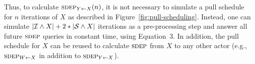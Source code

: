 












Thus, to calculate $\textsc{sdep}_{Y \small{\leftarrow} X}(n)$, it is not necessary to simulate
a pull schedule for $n$ iterations of $X$ as described in
Figure~\ref{fig:pull-scheduling}.  Instead, one can simulate $|{\cal
I} \wedge X| + 2 * |{\cal S} \wedge X|$ iterations as a pre-processing
step and answer all future $\textsc{sdep}$ queries in constant time, using
Equation~3.  In addition, the pull schedule for $X$ can be reused to
calculate $\textsc{sdep}$ from $X$ to any other actor (e.g., $\textsc{sdep}_{W \small{\leftarrow} X}$ in
addition to $\textsc{sdep}_{Y \small{\leftarrow} X}$).

